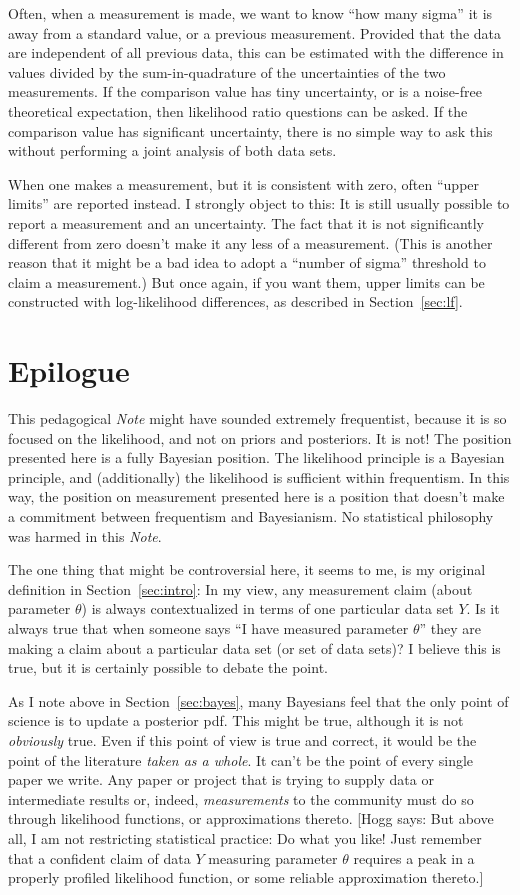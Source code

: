 \documentclass{article}
\newcommand{\documentname}{\textsl{Note}}
\newcommand{\sectionname}{Section}
\newcommand{\secref}[1]{\sectionname~\ref{#1}}
\newcommand{\hogg}[1]{{\color{blue}[Hogg says: {#1}]}}
\begin{document}
Often, when a measurement is made, we want to know ``how many sigma'' it is away from a standard value, or a previous measurement.
Provided that the data are independent of all previous data, this can be estimated with the difference in values divided by the sum-in-quadrature of the uncertainties of the two measurements.
If the comparison value has tiny uncertainty, or is a noise-free theoretical expectation, then likelihood ratio questions can be asked.
If the comparison value has significant uncertainty, there is no simple way to ask this without performing a joint analysis of both data sets.

When one makes a measurement, but it is consistent with zero, often ``upper limits'' are reported instead.
I strongly object to this: It is still usually possible to report a measurement and an uncertainty.
The fact that it is not significantly different from zero doesn't make it any less of a measurement.
(This is another reason that it might be a bad idea to adopt a ``number of sigma'' threshold to claim a measurement.)
But once again, if you want them, upper limits can be constructed with log-likelihood differences, as described in \secref{sec:lf}.

\section{Epilogue}\label{sec:discussion}
This pedagogical \documentname{} might have sounded extremely frequentist, because it is so focused on the likelihood, and not on priors and posteriors.
It is not!
The position presented here is a fully Bayesian position.
The likelihood principle is a Bayesian principle, and (additionally) the likelihood is sufficient within frequentism.
In this way, the position on measurement presented here is a position that doesn't make a commitment between frequentism and Bayesianism.
No statistical philosophy was harmed in this \documentname.

The one thing that might be controversial here, it seems to me, is my original definition in \secref{sec:intro}:
In my view, any measurement claim (about parameter $\theta$) is always contextualized in terms of one particular data set $Y$.
Is it always true that when someone says ``I have measured parameter $\theta$'' they are making a claim about a particular data set (or set of data sets)?
I believe this is true, but it is certainly possible to debate the point.

As I note above in \secref{sec:bayes}, many Bayesians feel that the only point of science is to update a posterior pdf.
This might be true, although it is not \emph{obviously} true.
Even if this point of view is true and correct, it would be the point of the literature \emph{taken as a whole}. 
It can't be the point of every single paper we write.
Any paper or project that is trying to supply data or intermediate results or, indeed, \emph{measurements} to the community must do so through likelihood functions, or approximations thereto.
\hogg{But above all, I am not restricting statistical practice: Do what you like! Just remember that a confident claim of data $Y$ measuring parameter $\theta$ requires a peak in a properly profiled likelihood function, or some reliable approximation thereto.}
\end{document}
